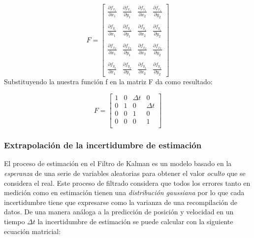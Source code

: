 \begin{equation}
F =
\begin{bmatrix}
\frac{\partial f_{x_1}}{\partial x_1} & \frac{\partial f_{x_1}}{\partial y_1} & \frac{\partial f_{x_1}}{\partial x_2} & \frac{\partial f_{x_1}}{\partial y_2}\\
\\
\frac{\partial f_{y_1}}{\partial x_1} & \frac{\partial f_{y_1}}{\partial y_1} & \frac{\partial f_{y_1}}{\partial x_2} & \frac{\partial f_{y_1}}{\partial y_2}\\
\\
\frac{\partial f_{x_2}}{\partial x_1} & \frac{\partial f_{x_2}}{\partial y_1} & \frac{\partial f_{x_2}}{\partial x_2} & \frac{\partial f_{x_2}}{\partial y_2}\\
\\
\frac{\partial f_{y_2}}{\partial x_1} & \frac{\partial f_{y_2}}{\partial y_1} & \frac{\partial f_{y_2}}{\partial x_2} & \frac{\partial f_{y_2}}{\partial y_2}
\end{bmatrix}
\end{equation}
Substituyendo la nuestra función  f en la matriz F da como resultado:

\begin{equation}
F =
\begin{bmatrix}
1 & 0 & \Delta t & 0\\ 
0 & 1 & 0 & \Delta t\\
0 & 0 & 1 & 0\\
0 & 0 & 0 & 1\\
\end{bmatrix}
\end{equation}

		\subsubsection*{Extrapolación de la incertidumbre de estimación}
	El proceso de estimación en el Filtro de Kalman es un modelo basado en la \textit{esperanza} de una serie de variables aleatorias para obtener el valor \textit{oculto} que se considera el real. Este proceso de filtrado considera que todos los errores tanto en medición como en estimación tienen una \textit{distribución gaussiana} por lo que cada incertidumbre tiene que expresarse como la varianza de una recompilación de datos. De una manera análoga a la predicción de posición y velocidad en un tiempo $\Delta t$ la incertidumbre de estimación se puede calcular con la siguiente ecuación matricial:
	
